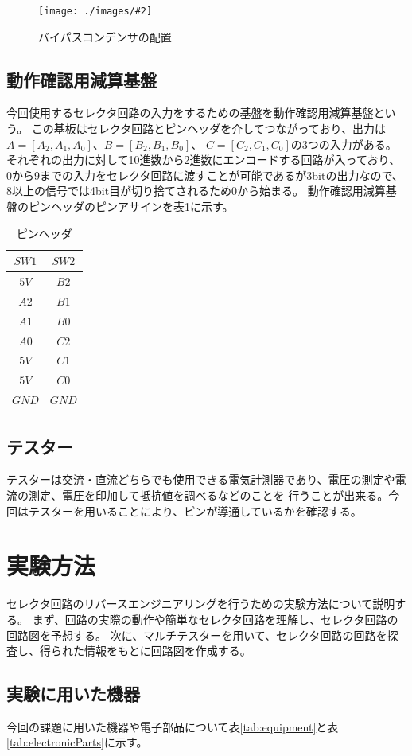 \documentclass[a4paper,11pt,dvipdfmx]{jsarticle}
\newcommand{\Figure}[4]{
\begin{figure}[H]
\centering
\texttt{[image: ./images/\#2]}
\caption{#3}
\label{fig:#4}
\end{figure}
}
\begin{document}
\Figure{0.8}{cap.drawio.png}{バイパスコンデンサの配置}{bypass}

\subsection{動作確認用減算基盤}
今回使用するセレクタ回路の入力をするための基盤を動作確認用減算基盤という。
この基板はセレクタ回路とピンヘッダを介してつながっており、出力は$A= [A_2, A_1, A_0]$、$B = [B_2, B_1, B_0]$、
$C = [C_2, C_1, C_0]$の3つの入力がある。それぞれの出力に対して10進数から2進数にエンコードする回路が入っており、
0から9までの入力をセレクタ回路に渡すことが可能であるが3bitの出力なので、8以上の信号では4bit目が切り捨てされるため0から始まる。
動作確認用減算基盤のピンヘッダのピンアサインを表\ref{tab:pin}に示す。
\begin{table}[H]
  \centering
  \caption{ピンヘッダ}
  \label{tab:pin}
  \begin{tabular}{|c|c|}
    \hline
    $SW1$  & $SW2$  \\
    \hline
    $5V$ & $B2$ \\
    $A2$ & $B1$ \\
    $A1$ & $B0$ \\
    $A0$ & $C2$ \\
    $5V$ & $C1$ \\
    $5V$ & $C0$ \\
    $GND$ & $GND$ \\
    \hline
  \end{tabular}
\end{table}

\subsection{テスター}
テスターは交流・直流どちらでも使用できる電気計測器であり、電圧の測定や電流の測定、電圧を印加して抵抗値を調べるなどのことを
行うことが出来る。今回はテスターを用いることにより、ピンが導通しているかを確認する。

\section{実験方法}
セレクタ回路のリバースエンジニアリングを行うための実験方法について説明する。
まず、回路の実際の動作や簡単なセレクタ回路を理解し、セレクタ回路の回路図を予想する。
次に、マルチテスターを用いて、セレクタ回路の回路を探査し、得られた情報をもとに回路図を作成する。

\subsection{実験に用いた機器}
今回の課題に用いた機器や電子部品について表\ref{tab:equipment}と表\ref{tab:electronicParts}に示す。
\end{document}
